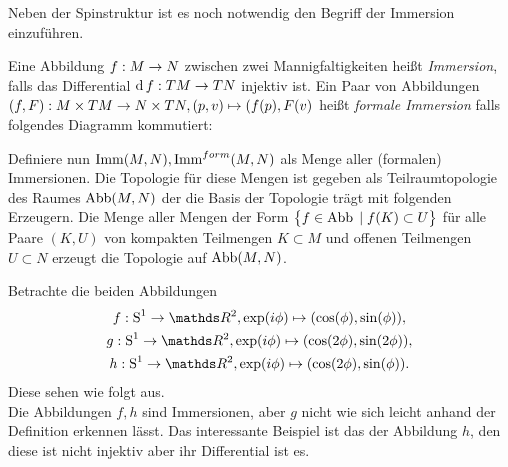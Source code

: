 
Neben der Spinstruktur ist es noch notwendig den Begriff der Immersion 
einzuführen.

\begin{Def}
	Eine Abbildung $f : M \rightarrow N$ zwischen zwei Mannigfaltigkeiten
	heißt \textit{Immersion}, falls das Differential $\operatorname{d} f : TM \rightarrow TN$ 
	injektiv ist.
	Ein Paar von Abbildungen $\abb{(f,F)}{M \times TM}{N \times TN} ,%
	(p,v) \mapsto (f(p),F(v)$ heißt \textit{formale Immersion} falls folgendes
	Diagramm kommutiert:
	\begin{center}
		
		
	\end{center}
	
	Definiere nun $\operatorname{Imm}(M,N),\operatorname{Imm}^{form}(M,N)$ als Menge aller (formalen) Immersionen. Die Topologie für diese Mengen ist gegeben als Teilraumtopologie des Raumes $\operatorname{Abb}(M,N)$ der die Basis der Topologie 
	trägt mit folgenden Erzeugern. Die Menge aller Mengen der Form $\bigl\{ f \in \operatorname{Abb} \; | \;  f(K) \subset U \bigr\}$
	für alle Paare $(K,U)$ von kompakten Teilmengen $K \subset M$ und
	offenen Teilmengen $U \subset N$ erzeugt die Topologie auf $\operatorname{Abb}(M,N)$.
\end{Def}


\begin{Bsp}
	Betrachte die beiden Abbildungen 
	\begin{gather*}
		\abb{f}{\Sp^1}{\R^2}, \exp(i\phi)%
		\mapsto (\cos(\phi),\sin(\phi)),\\
		\abb{g}{\Sp^1}{\R^2}, \exp(i\phi)%
		\mapsto (\cos(2\phi),\sin(2\phi)),\\
		\abb{h}{\Sp^1}{\R^2}, \exp(i\phi)%
		\mapsto (\cos(2\phi),\sin(\phi)).
	\end{gather*}
	Diese sehen wie folgt aus.\\
	
	Die Abbildungen $f,h$ sind Immersionen, aber $g$ nicht wie sich leicht
	anhand der Definition erkennen lässt. Das interessante Beispiel ist
	das der Abbildung $h$, den diese ist nicht injektiv aber ihr Differential
	ist es.
\end{Bsp}

